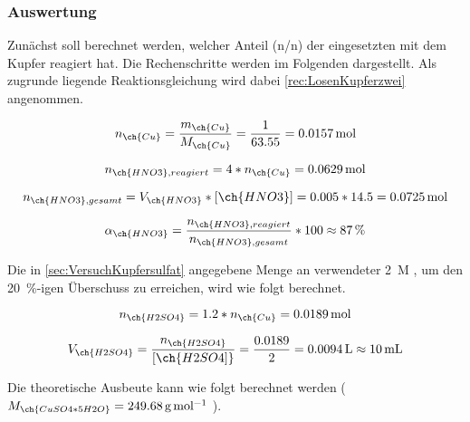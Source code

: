 \documentclass{article}
\begin{document}
      \subsubsection{Auswertung} \label{sec:AuswertungKupfersulfat}
      
        Zunächst soll berechnet werden, welcher Anteil (n/n) der eingesetzten  mit dem Kupfer reagiert hat. Die Rechenschritte werden im Folgenden dargestellt. Als zugrunde liegende Reaktionsgleichung wird dabei \ref{rec:LosenKupferzwei} angenommen.
        
        \begin{equation}
          n_{\ch{Cu}} = \frac{m_{\ch{Cu}}}{M_{\ch{Cu}}} = \frac{1}{63.55} = \SI[mode=text]{0.0157}{\mole}
        \end{equation}
        
        \begin{equation}
          n_{\ch{HNO3}, reagiert} = 4 * n_{\ch{Cu}} = \SI[mode=text]{0.0629}{\mole}
        \end{equation}
        
        \begin{equation}
          n_{\ch{HNO3}, gesamt} = V_{\ch{HNO3}} * [\ch{HNO3}] = 0.005 * 14.5 = \SI[mode=text]{0.0725}{\mole}
        \end{equation}
        
        \begin{equation}
          \alpha_{\ch{HNO3}} = \frac{n_{\ch{HNO3}, reagiert}}{n_{\ch{HNO3}, gesamt}} * 100 \approx \SI[mode=text]{87}{\percent} 
        \end{equation}
        
        Die in \ref{sec:VersuchKupfersulfat} angegebene Menge an verwendeter \SI[mode=text]{2}{M} , um den \SI[mode=text]{20}{\percent}-igen Überschuss zu erreichen, wird wie folgt berechnet.
        
        \begin{equation}
          n_{\ch{H2SO4}} = 1.2 * n_{\ch{Cu}} = \SI[mode=text]{0.0189}{\mole} 
        \end{equation}
        
        \begin{equation}
          V_{\ch{H2SO4}} = \frac{n_{\ch{H2SO4}}}{[\ch{H2SO4]}} = \frac{0.0189}{2} = \SI[mode=text]{0.0094}{\liter} \approx \SI[mode=text]{10}{\milli\liter}
        \end{equation}
      
        Die theoretische Ausbeute kann wie folgt berechnet werden ($M_{\ch{CuSO4 * 5 H2O}} = \SI[mode=text]{249.68}{\gram\per\mole}$ ).
        
\end{document}
